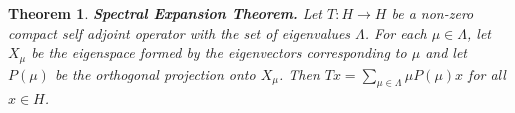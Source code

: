 \documentclass[two column]{article}
\newtheorem{theorem}{Theorem}[subsection]
\begin{document}
\begin{theorem}
{\bf Spectral Expansion Theorem.} Let $T : H \rightarrow H$ be a non-zero compact self adjoint operator with the set of eigenvalues $\Lambda$. For each $\mu \in \Lambda$, let $X_{\mu}$ be the eigenspace formed  by the eigenvectors corresponding to $\mu$ and let $P(\mu)$ be the orthogonal projection onto $X_{\mu}$. Then $Tx = \sum_{\mu \in \Lambda} \mu P(\mu)x$ for all $x \in H$. 
\end{theorem}
\end{document}
